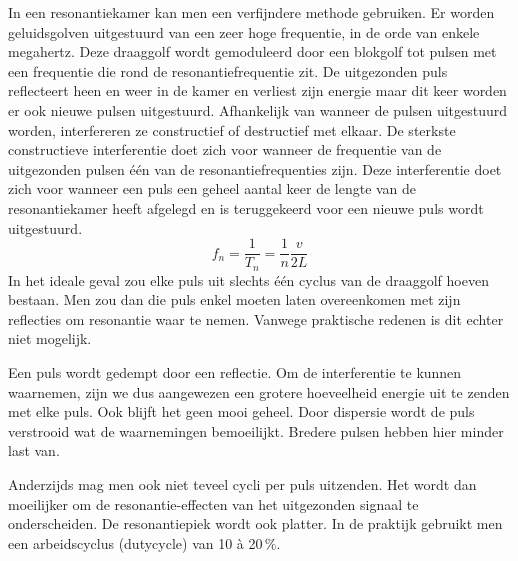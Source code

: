 In een resonantiekamer kan men een verfijndere methode gebruiken. Er worden 
geluidsgolven uitgestuurd van een zeer hoge frequentie, in de orde van enkele 
megahertz. Deze draaggolf wordt gemoduleerd door een blokgolf tot pulsen met 
een frequentie die rond de resonantiefrequentie zit. De uitgezonden puls 
reflecteert heen en weer in de kamer en verliest zijn energie maar dit keer 
worden er ook nieuwe pulsen uitgestuurd. Afhankelijk van wanneer de pulsen 
uitgestuurd worden, interfereren ze constructief of destructief met elkaar. De 
sterkste constructieve interferentie doet zich voor wanneer de frequentie van 
de uitgezonden pulsen \'e\'en van de resonantiefrequenties zijn. Deze 
interferentie doet zich voor wanneer een puls een geheel aantal keer de lengte 
van de resonantiekamer heeft afgelegd en is teruggekeerd voor een nieuwe puls 
wordt uitgestuurd.
\begin{equation}
\label{resfreq}
f_n = \frac{1}{T_n} = \frac{1}{n} \frac{v}{2L}
\end{equation}
In het ideale geval zou elke puls uit slechts \'e\'en cyclus van de draaggolf 
hoeven bestaan. Men zou dan die puls enkel moeten laten overeenkomen met zijn 
reflecties om resonantie waar te nemen. Vanwege praktische redenen is dit 
echter niet mogelijk.

Een puls wordt gedempt door een reflectie. Om de interferentie te kunnen 
waarnemen, zijn we dus aangewezen een grotere hoeveelheid energie uit te zenden 
met elke puls. Ook blijft het geen mooi geheel. Door dispersie wordt de puls 
verstrooid wat de waarnemingen bemoeilijkt. Bredere pulsen hebben hier minder 
last van.


Anderzijds mag men ook niet teveel cycli per puls uitzenden. Het wordt dan 
moeilijker om de resonantie-effecten van het uitgezonden signaal te 
onderscheiden. De resonantiepiek wordt ook platter. In de praktijk gebruikt men 
een arbeidscyclus (dutycycle) van 10 \`a 20\,\%.  




